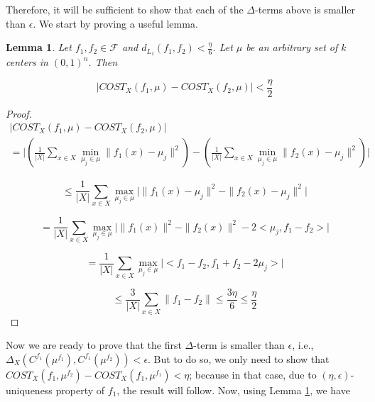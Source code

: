 \documentclass[letterpaper,12pt,titlepage,oneside,final]{book}
\newtheorem{lemma}{Lemma}
\begin{document}
Therefore, it will be sufficient to show that each of the $\Delta$-terms above is smaller than $\epsilon$. We start by proving a useful lemma.

\begin{lemma}\label{lemma3}
Let $f_1,f_2\in \mathcal{F}$ and $d_{L_1}(f_1,f_2) < \frac{\eta}{6}$. Let $\mu$ be an arbitrary set of $k$ centers in $(0,1)^n$. Then

$$|COST_X(f_1, \mu) - COST_X(f_2, \mu)| < \frac{\eta}{2}$$
\end{lemma}

\begin{proof}


\begin{multline}
|COST_X(f_1, \mu) - COST_X(f_2, \mu)|\\
= \Bigg|\left(\frac{1}{|X|} \sum_{x\in X} \min_{\mu_j\in\mu}\| f_1(x)-\mu_j  \|^2\right)  
 - \left(\frac{1}{|X|}\sum_{x\in X} \min_{\mu_j\in\mu}\| f_2(x)-\mu_j  \|^2 \right)\Bigg| 
\end{multline}


\begin{equation}
 \leq \frac{1}{|X|} \sum_{x\in X} \max_{\mu_j\in\mu} \Big|  \| f_1(x)-\mu_j  \|^2- \| f_2(x)-\mu_j  \|^2  \Big|
\end{equation}


\begin{equation}
 = \frac{1}{|X|} \sum_{x\in X} \max_{\mu_j\in\mu} \Big|  
 \|f_1(x)\|^2 - \|f_2(x)\|^2 - 2 <\mu_j, f_1-f_2>
   \Big|
\end{equation}

\begin{equation}
 = \frac{1}{|X|} \sum_{x\in X} \max_{\mu_j\in\mu} \Big|  
 <f_1 - f_2, f_1 + f_2 - 2 \mu_j>
   \Big|
\end{equation}


\begin{equation}
 \leq \frac{3}{|X|} \sum_{x\in X} \| f_1 - f_2\| \leq \frac{3\eta}{6} \leq \frac{\eta}{2}
\end{equation}




\end{proof}

Now we are ready to prove that the first $\Delta$-term is smaller than $\epsilon$, i.e.,  $\Delta_X(C^{f_1}(\mu^{f_1}), C^{f_1}(\mu^{f_2})) < \epsilon$. But to do so, we only need to show that $COST_X(f_1, \mu^{f_2}) - COST_X(f_1, \mu^{f_1}) < \eta$; because in that case, due to $(\eta,\epsilon)$-uniqueness property of $f_1$, the result will follow. Now, using Lemma \ref{lemma3}, we have
\end{document}
